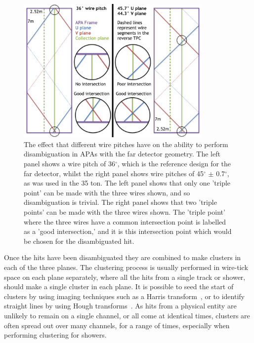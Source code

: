 \begin{figure}
  \centering
  \includegraphics[width=0.85\textwidth]{WireAngleCondition}
  \caption[Performing disambiguation with different wire pitches.]
          {The effect that different wire pitches have on the ability to perform disambiguation in APAs with the far detector geometry. The left panel shows a wire pitch of 36$^{\circ}$, which is the reference design for the far detector, whilst the right panel shows wire pitches of 45$^{\circ}$ $\pm$ 0.7$^{\circ}$, as was used in the 35 ton. The left panel shows that only one 'triple point' can be made with the three wires shown, and so disambiguation is trivial. The right panel shows that two 'triple points' can be made with the three wires shown. The 'triple point' where the three wires have a common intersection point is labelled as a 'good intersection,' and it is this intersection point which would be chosen for the disambiguated hit.}
  \label{fig:WirePitches}
\end{figure}

Once the hits have been disambiguated they are combined to make clusters in each of the three planes. The clustering process is usually performed in wire-tick space on each plane separately, where all the hits from a single track or shower, should make a single cluster in each plane. It is possible to seed the start of clusters by using imaging techniques such as a Harris transform~\citep{HarrisTrans}, or to identify straight lines by using Hough transforms~\citep{HoughTrans}. As hits from a physical entity are unlikely to remain on a single channel, or all come at identical times, clusters are often spread out over many channels, for a range of times, especially when performing clustering for showers. \\

